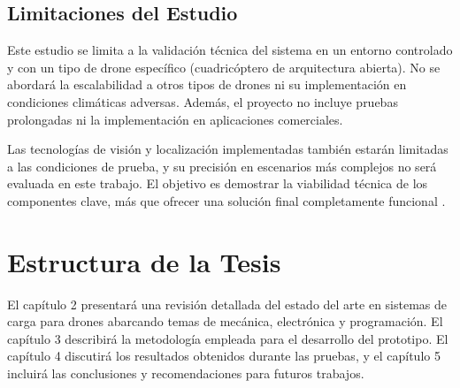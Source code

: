 \subsection{Limitaciones del Estudio}

Este estudio se limita a la validación técnica del sistema en un entorno controlado y con un tipo de drone específico (cuadricóptero de arquitectura abierta). No se abordará la escalabilidad a otros tipos de drones ni su implementación en condiciones climáticas adversas. Además, el proyecto no incluye pruebas prolongadas ni la implementación en aplicaciones comerciales.

Las tecnologías de visión y localización implementadas también estarán limitadas a las condiciones de prueba, y su precisión en escenarios más complejos no será evaluada en este trabajo. El objetivo es demostrar la viabilidad técnica de los componentes clave, más que ofrecer una solución final completamente funcional \cite{cite4}.

\section{Estructura de la Tesis}

El capítulo 2 presentará una revisión detallada del estado del arte en sistemas de carga para drones abarcando temas de mecánica, electrónica y programación. El capítulo 3 describirá la metodología empleada para el desarrollo del prototipo. El capítulo 4 discutirá los resultados obtenidos durante las pruebas, y el capítulo 5 incluirá las conclusiones y recomendaciones para futuros trabajos.

